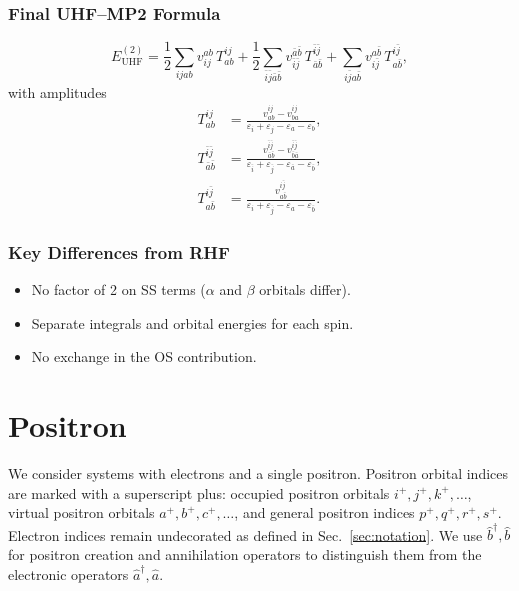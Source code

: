 \documentclass[a4paper,12pt,oneside]{book}
\newcommand{\op}{\hat}
\newcommand{\sect}[1]{Sec.~\ref{#1}}
\newcommand{\spa}[1]{{#1}}
\newcommand{\spb}[1]{\bar{#1}}
\newcommand{\pos}[1]{{#1}^{+}}
\begin{document}
\subsection{Final UHF--MP2 Formula}
\begin{equation}
\label{eq:uhf-mp2}
\boxed{E^{(2)}_{\mathrm{UHF}} = \frac{1}{2} \sum_{\spa{i}\spa{j}\spa{a}\spa{b}} v_{\spa{i}\spa{j}}^{\spa{a}\spa{b}} \, T^{\spa{i}\spa{j}}_{\spa{a}\spa{b}}
+ \frac{1}{2} \sum_{\spb{i}\spb{j}\spb{a}\spb{b}} v_{\spb{i}\spb{j}}^{\spb{a}\spb{b}} \, T^{\spb{i}\spb{j}}_{\spb{a}\spb{b}}
+ \sum_{\spa{i}\spb{j}\spa{a}\spb{b}} v_{\spa{i}\spb{j}}^{\spa{a}\spb{b}} \, T^{\spa{i}\spb{j}}_{\spa{a}\spb{b}},}
\end{equation}
with amplitudes
\begin{equation}
\begin{aligned}
T^{\spa{i}\spa{j}}_{\spa{a}\spa{b}} &= \frac{v^{\spa{i}\spa{j}}_{\spa{a}\spa{b}} - v^{\spa{i}\spa{j}}_{\spa{b}\spa{a}}}
{\varepsilon_{\spa{i}} + \varepsilon_{\spa{j}} - \varepsilon_{\spa{a}} - \varepsilon_{\spa{b}}}, \\[4pt]
T^{\spb{i}\spb{j}}_{\spb{a}\spb{b}} &= \frac{v^{\spb{i}\spb{j}}_{\spb{a}\spb{b}} - v^{\spb{i}\spb{j}}_{\spb{b}\spb{a}}}
{\varepsilon_{\spb{i}} + \varepsilon_{\spb{j}} - \varepsilon_{\spb{a}} - \varepsilon_{\spb{b}}}, \\[4pt]
T^{\spa{i}\spb{j}}_{\spa{a}\spb{b}} &= \frac{v^{\spa{i}\spb{j}}_{\spa{a}\spb{b}}}
{\varepsilon_{\spa{i}} + \varepsilon_{\spb{j}} - \varepsilon_{\spa{a}} - \varepsilon_{\spb{b}}}.
\end{aligned}
\end{equation}

\subsection{Key Differences from RHF}
\begin{itemize}
  \item No factor of 2 on SS terms ($\alpha$ and $\beta$ orbitals differ).
  \item Separate integrals and orbital energies for each spin.
  \item No exchange in the OS contribution.
\end{itemize}


\chapter{Positron}

We consider systems with electrons and a single positron.
Positron orbital indices are marked with a superscript plus:
occupied positron orbitals $\pos{i},\pos{j},\pos{k},\ldots$,
virtual positron orbitals $\pos{a},\pos{b},\pos{c},\ldots$,
and general positron indices $\pos{p},\pos{q},\pos{r},\pos{s}$.
Electron indices remain undecorated as defined in \sect{sec:notation}.
We use $\op b^\dagger, \op b$ for positron creation and annihilation operators
to distinguish them from the electronic operators $\op a^\dagger, \op a$.
\end{document}
